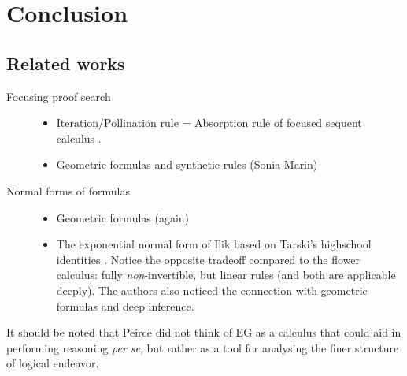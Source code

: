 

\section{Conclusion}


\subsection{Related works}

\begin{description}
  \item[Focusing proof search]
    \begin{itemize}
      \item Iteration/Pollination rule = Absorption rule of focused sequent
        calculus .
      \item Geometric formulas and synthetic rules (Sonia Marin)
    \end{itemize}
  \item[Normal forms of formulas]
    \begin{itemize}
      \item Geometric formulas (again)
      \item The exponential normal form of Ilik based on Tarski's highschool
  identities . Notice the opposite
  tradeoff compared to the flower calculus: fully \emph{non}-invertible, but
  linear rules (and both are applicable deeply). The authors also noticed the
  connection with geometric formulas and deep inference.
    \end{itemize} 
\end{description}

It should be noted that Peirce did not think of EG as a calculus that could aid
in performing reasoning \emph{per se}, but rather as a tool for analysing the
finer structure of logical endeavor.

